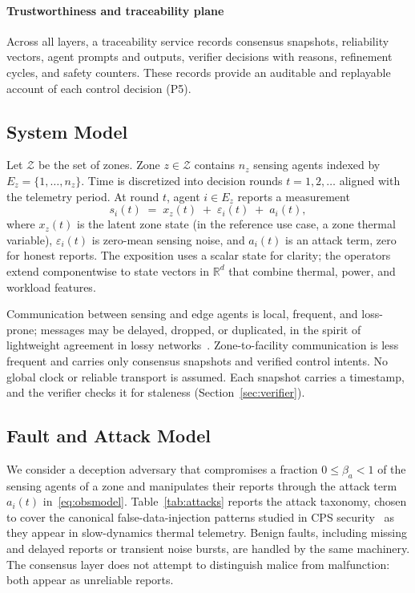 \documentclass[smartcities,article,submit,moreauthors]{Definitions/mdpi}
\newcommand{\R}{\mathbb{R}}
\begin{document}
\paragraph{Trustworthiness and traceability plane}
Across all layers, a traceability service records consensus snapshots,
reliability vectors, agent prompts and outputs, verifier decisions with
reasons, refinement cycles, and safety counters. These records provide an
auditable and replayable account of each control decision (P5).

\subsection{System Model}
\label{sec:sysmodel}

Let $\mathcal{Z}$ be the set of zones. Zone $z\in\mathcal{Z}$ contains
$n_z$ sensing agents indexed by $E_z=\{1,\dots,n_z\}$. Time is
discretized into decision rounds $t=1,2,\dots$ aligned with the
telemetry period. At round $t$, agent $i\in E_z$ reports a measurement
\begin{equation}
s_i(t) \;=\; x_z(t) \;+\; \varepsilon_i(t) \;+\; a_i(t),
\label{eq:obsmodel}
\end{equation}
where $x_z(t)$ is the latent zone state (in the reference use case, a
zone thermal variable), $\varepsilon_i(t)$ is zero-mean sensing noise,
and $a_i(t)$ is an attack term, zero for honest reports. The exposition
uses a scalar state for clarity; the operators extend componentwise to
state vectors in $\R^d$ that combine thermal, power, and workload
features.

Communication between sensing and edge agents is local, frequent, and
loss-prone; messages may be delayed, dropped, or duplicated, in the
spirit of lightweight agreement in lossy
networks~\cite{zhang2021approx}. Zone-to-facility communication is less
frequent and carries only consensus snapshots and verified control
intents. No global clock or reliable transport is assumed. Each snapshot
carries a timestamp, and the verifier checks it for staleness
(Section~\ref{sec:verifier}).

\subsection{Fault and Attack Model}
\label{sec:faultmodel}

We consider a deception adversary that compromises a fraction
$0\le \beta_a<1$ of the sensing agents of a zone and manipulates their
reports through the attack term $a_i(t)$
in~\eqref{eq:obsmodel}. Table~\ref{tab:attacks} reports the attack
taxonomy, chosen to cover the canonical false-data-injection patterns
studied in CPS security~\cite{padhan2022} as they appear in
slow-dynamics thermal telemetry. Benign faults, including missing and
delayed reports or transient noise bursts, are handled by the same
machinery. The consensus layer does not attempt to distinguish malice
from malfunction: both appear as unreliable reports.
\end{document}
